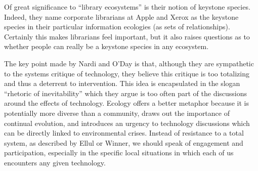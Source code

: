 Of great significance to ``library ecosystems'' is their notion of keystone species. Indeed, they name corporate librarians at Apple and Xerox as the keystone species in their particular information ecologies (as sets of relationships). Certainly this makes librarians feel important, but it also raises questions as to whether people can really be a keystone species in any ecosystem.

The key point made by Nardi and O'Day is that, although they are sympathetic to the systems critique of technology, they believe this critique is too totalizing and thus a deterrent to intervention. This idea is encapsulated in the slogan ``rhetoric of inevitability'' which they argue is too often part of the discussions around the effects of technology. Ecology offers a better metaphor because it is potentially more diverse than a community, draws out the importance of continual evolution, and introduces an urgency to technology discussions which can be directly linked to environmental crises. Instead of resistance to a total system, as described by Ellul or Winner, we should speak of engagement and participation, especially in the specific local situations in which each of us encounters any given technology.